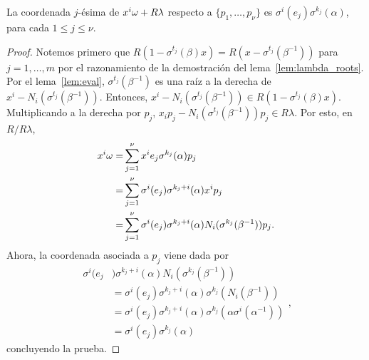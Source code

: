 \begin{lemma}
    La coordenada \(j\)-ésima de \(x^{i}\omega + R\lambda\) respecto a \(\{p_1, \ldots, p_\nu\}\) es \(\sigma^{i}(e_j)\sigma^{k_j}(\alpha)\), para cada \(1 \le j \le \nu\).
\end{lemma}
\begin{proof}
Notemos primero que \(R(1 - \sigma^{t_j}(\beta)x) = R(x - \sigma^{t_j}(\beta^{-1}))\) para \(j = 1, \ldots, m\) por el razonamiento de la demostración del lema~\ref{lem:lambda_roots}. Por el lema~\ref{lem:eval}, \(\sigma^{t_j}(\beta^{-1})\) es una raíz a la derecha de \(x^{i} - N_i(\sigma^{t_j}(\beta^{-1}))\). Entonces, \(x^{i} - N_i(\sigma^{t_j}(\beta^{-1})) \in R(1 - \sigma^{t_j}(\beta)x)\). Multiplicando a la derecha por \(p_j\),  \(x_ip_j - N_i(\sigma^{t_j}(\beta^{-1}))p_j \in R\lambda\). Por esto, en \(R / R\lambda\),
 \[
\begin{aligned}
    x^{i}\omega =& \sum_{j=1}^{\nu} x^{i}e_j \sigma^{k_j}(\alpha)p_j \\
    =& \sum_{j=1}^{\nu} \sigma^{i}(e_j) \sigma^{k_j+i}(\alpha)x^{i}p_j \\
    =& \sum_{j=1}^{\nu} \sigma^{i}(e_j) \sigma^{k_j+i}(\alpha)N_i(\sigma^{k_j}(\beta^{-1}))p_j.\\
\end{aligned}
\]
Ahora, la coordenada asociada a \(p_j\) viene dada por
\[
\begin{aligned}
    \sigma^{i}(e_j&)\sigma^{k_j+i}(\alpha)N_i(\sigma^{k_j}(\beta^{-1}))\\
    &= \sigma^{i}(e_j)\sigma^{k_j+i}(\alpha)\sigma^{k_j}(N_i(\beta^{-1}))\\
    &= \sigma^{i}(e_j)\sigma^{k_j+i}(\alpha)\sigma^{k_j}(\alpha\sigma^{i}(\alpha^{-1}))\\
    &= \sigma^{i}(e_j)\sigma^{k_j}(\alpha)
\end{aligned}
,\]
concluyendo la prueba.
\end{proof}

